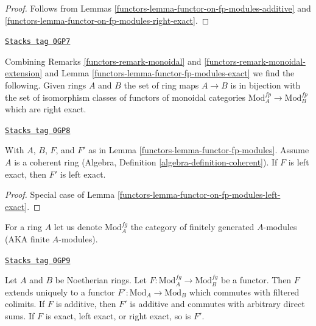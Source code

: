 \begin{proof}

Follows from Lemmas \ref{functors-lemma-functor-on-fp-modules-additive} and
\ref{functors-lemma-functor-on-fp-modules-right-exact}.
\end{proof}

\begin{remark}
\label{functors-remark-monoidal-extension-exact}
\href{https://stacks.math.columbia.edu/tag/0GP7}{\texttt{Stacks tag 0GP7}}

Combining Remarks \ref{functors-remark-monoidal} and \ref{functors-remark-monoidal-extension}
and Lemma \ref{functors-lemma-functor-fp-modules-exact}
we find the following. Given rings $A$ and $B$ the set of ring maps $A \to B$
is in bijection with the set of isomorphism classes
of functors of monoidal categories $\text{Mod}^{fp}_A \to \text{Mod}^{fp}_B$
which are right exact.
\end{remark}

\begin{lemma}
\label{functors-lemma-functor-fp-modules-left-exact}
\href{https://stacks.math.columbia.edu/tag/0GP8}{\texttt{Stacks tag 0GP8}}

With $A$, $B$, $F$, and $F'$ as in Lemma \ref{functors-lemma-functor-fp-modules}.
Assume $A$ is a coherent ring
(Algebra, Definition \ref{algebra-definition-coherent}).
If $F$ is left exact, then $F'$ is left exact.
\end{lemma}

\begin{proof}

Special case of Lemma \ref{functors-lemma-functor-on-fp-modules-left-exact}.
\end{proof}

For a ring $A$ let us denote $\text{Mod}^{fg}_A$ the category of
finitely generated $A$-modules (AKA finite $A$-modules).

\begin{lemma}
\label{functors-lemma-functor-finite-modules}
\href{https://stacks.math.columbia.edu/tag/0GP9}{\texttt{Stacks tag 0GP9}}

Let $A$ and $B$ be Noetherian rings. Let
$F : \text{Mod}^{fg}_A \to \text{Mod}^{fg}_B$ be a functor.
Then $F$ extends uniquely to a functor $F' : \text{Mod}_A \to \text{Mod}_B$
which commutes with filtered colimits. If $F$ is additive, then
$F'$ is additive and commutes with arbitrary direct sums.
If $F$ is exact, left exact, or right exact, so is $F'$.
\end{lemma}

